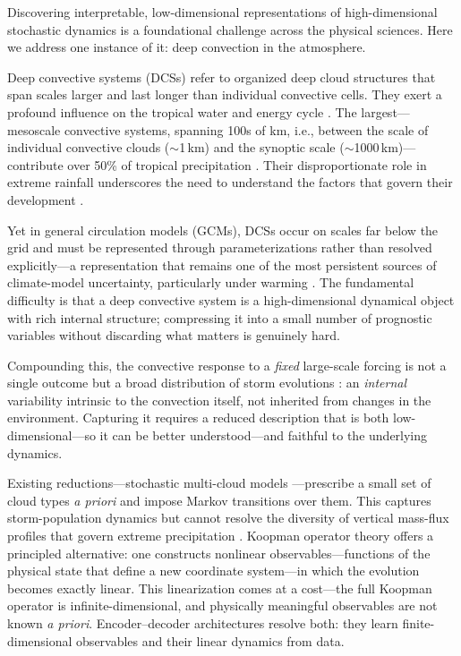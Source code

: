 \documentclass[11pt]{article}
\begin{document}

Discovering interpretable, low-dimensional representations of high-dimensional stochastic dynamics is a foundational challenge across the physical sciences. Here we address one instance of it: deep convection in the atmosphere.

Deep convective systems (DCSs) refer to organized deep cloud structures that span scales larger and last longer than individual convective cells. They exert a profound influence on the tropical water and energy cycle \citep{houze2004mesoscale, chakraborty2023overview}. The largest---mesoscale convective systems, spanning 100s of km, i.e., between the scale of individual convective clouds ($\sim$1\,km) and the synoptic scale ($\sim$1000\,km)---contribute over 50\% of tropical precipitation \citep{roca2020extreme, feng2024mesoscale}. Their disproportionate role in extreme rainfall \citep{roca2020extreme, feng2023mesoscale} underscores the need to understand the factors that govern their development \citep{prein2022towards}.

Yet in general circulation models (GCMs), DCSs occur on scales far below the grid and must be represented through parameterizations rather than resolved explicitly---a representation that remains one of the most persistent sources of climate-model uncertainty, particularly under warming \citep{yang2023impact, bolot2025no}. The fundamental difficulty is that a deep convective system is a high-dimensional dynamical object with rich internal structure; compressing it into a small number of prognostic variables without discarding what matters is genuinely hard.

Compounding this, the convective response to a \emph{fixed} large-scale forcing is not a single outcome but a broad distribution of storm evolutions \citep{abramian2025key, feng2025mesoscale, hu2020observed, fiolleau2024database}: an \emph{internal} variability intrinsic to the convection itself, not inherited from changes in the environment. Capturing it requires a reduced description that is both low-dimensional---so it can be better understood---and faithful to the underlying dynamics.

Existing reductions---stochastic multi-cloud models \citep{khouider2006multicloud, majda2008stochastic, khouider2010stochastic}---prescribe a small set of cloud types \emph{a priori} and impose Markov transitions over them. This captures storm-population dynamics but cannot resolve the diversity of vertical mass-flux profiles that govern extreme precipitation \citep{MullerYukari19, singh2012upward, abramian2023extreme, wang2022convective, li2025bimodal}. Koopman operator theory \citep{koopman1931hamiltonian, brunton2021modern} offers a principled alternative: one constructs nonlinear observables---functions of the physical state that define a new coordinate system---in which the evolution becomes exactly linear. This linearization comes at a cost---the full Koopman operator is infinite-dimensional, and physically meaningful observables are not known \emph{a priori}. Encoder--decoder architectures \citep{lusch2018deep, nathaniel2026generative} resolve both: they learn finite-dimensional observables and their linear dynamics from data.
\end{document}

